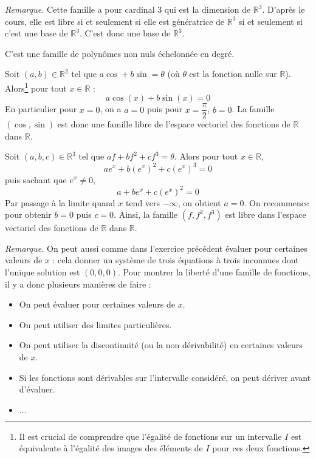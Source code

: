 \documentclass[a4paper,twoside,french,11pt]{VcCours}
\begin{document}
\noindent \textit{Remarque.} Cette famille a pour cardinal $3$ qui est la dimension de $\mathbb{R}^3$. D'après le cours, elle est libre si et seulement si elle est génératrice de $\mathbb{R}^3$ si et seulement si c'est une base de $\mathbb{R}^3$. C'est donc une base de $\mathbb{R}^3$.



\begin{Exercice}{}\end{Exercice}C'est une famille de polynômes non nuls échelonnée en degré.





\begin{Exercice}{}\end{Exercice}Soit $(a,b) \in \mathbb{R}^2$ tel que $a \cos + b \sin = \theta$ (où $\theta$ est la fonction nulle sur $\mathbb{R}$). Alors\footnote{Il est crucial de comprendre que l'égalité de fonctions sur un intervalle $I$ est équivalente à l'égalité des images des éléments de $I$ pour ces deux fonctions.} pour tout $x \in \mathbb{R}$ :
$$ a \cos(x) + b \sin(x) = 0 $$
En particulier pour $x=0$, on a $a=0$ puis pour $x = \dfrac{\pi}{2}$, $b=0$. La famille $(\cos, \sin)$ est donc une famille libre de l'espace vectoriel des fonctions de $\mathbb{R}$ dans $\mathbb{R}$.

 

\begin{Exercice}{}\end{Exercice}Soit $(a,b,c) \in \mathbb{R}^3$ tel que $af+bf^2+cf^3 = \theta$. Alors pour tout $x \in \mathbb{R}$,
$$ a e^x+ b (e^x)^2 + c(e^x)^3 = 0 $$
puis sachant que $e^x \neq 0$,
$$ a + be^x + c (e^x)^2 = 0$$
Par passage à la limite quand $x$ tend vers $- \infty$, on obtient $a=0$. On recommence pour obtenir $b=0$ puis $c=0$. Ainsi, la famille $(f,f^2,f^3)$ est libre dans l'espace vectoriel des fonctions de $\mathbb{R}$ dans $\mathbb{R}$.



\noindent \textit{Remarque.} On peut aussi comme dans l'exercice précédent évaluer pour certaines valeurs de $x$ : cela donner un système de trois équations à trois inconnues dont l'unique solution est $(0,0,0)$. Pour montrer la liberté d'une famille de fonctions, il y a donc plusieurs manières de faire :

\begin{itemize}
\item On peut évaluer pour certaines valeurs de $x$.
\item On peut utiliser des limites particulières.
\item On peut utiliser la discontinuité (ou la non dérivabilité) en certaines valeurs de $x$.
\item Si les fonctions sont dérivables sur l'intervalle considéré, on peut dériver avant d'évaluer.
\item $\ldots$
\end{itemize}
\end{document}

